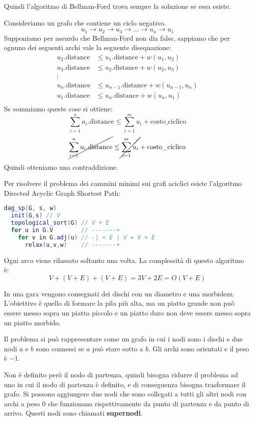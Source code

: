 \documentclass[a4paper]{article}
\begin{document}
Quindi l'algoritmo di Bellman-Ford trova sempre la soluzione se essa esiste.

\vspace{1em}
\noindent
Consideriamo un grafo che contiene un ciclo negativo.
\[
  u_1 \to u_2 \to u_3 \to \ldots \to u_n \to u_1
\] 
Supponiamo per assurdo che
Bellman-Ford non dia false, sappiamo che per ognuno dei seguenti archi vale la
seguente disequazione:
\[
\begin{aligned}
  u_2.\text{distance} & \le u_1.\text{distance} + w(u_1,u_2) \\
  u_3.\text{distance} & \le u_2.\text{distance} + w(u_2,u_3) \\
  \vdots\\
  u_n.\text{distance} & \le u_{n-1}.\text{distance} + w(u_{n-1},u_n) \\
  u_1.\text{distance} & \le u_{n}.\text{distance} + w(u_{n},u_1) \\
\end{aligned}
\] 
Se sommiamo queste cose si ottiene:
\[
  \sum_{i=1}^n u_i.\text{distance} \le \sum_{i=1}^m u_i + \text{costo\_ciclico}
\] 
\[
  \cancel{\sum_{i=1}^n u_i.\text{distance}} \le \cancel{\sum_{i=1}^m u_i} + \text{costo\_ciclico}
\] 
Quindi otteniamo una contraddizione.

\vspace{1em}
\noindent
Per risolvere il problema dei cammini minimi sui grafi aciclici esiste l'algoritmo
Directed Acyclic Graph Shortest Path:
\begin{lstlisting}[language=Scala]
dag_sp(G, s, w)
  init(G,s) // V
  topological_sort(G) // V + E
  for u in G.V        // -------+ 
    for v in G.adj(u) // -| < E | V = V + E
      relax(u,v,w)    // -------+
\end{lstlisting}
Ogni arco viene rilassato soltanto una volta. La complessità di questo algoritmo è:
\[
  V + (V + E) + (V + E) = 3V + 2E = O(V + E)
\] 

\begin{exercise}
  In una gara vengono consegnati dei dischi con un diametro e una morbidezz.
  L'obiettivo è quello di formare la pila più alta, ma un piatto grande non può essere
  messo sopra un piatto piccolo e un piatto duro non deve essere messo sopra un piatto
  morbido.

  \vspace{1em}
  \noindent
  Il problema si può rappresentare come un grafo in cui i nodi sono i dischi e due
  nodi \( a \) e \( b \) sono connessi se \( a \) può stare sotto a \( b \). Gli
  archi sono orientati e il peso è \( -1 \).

  \vspace{1em}
  \noindent
  Non è definito però il nodo di partenza, quindi bisogna ridurre il problema ad uno
  in cui il nodo di partenza è definito, e di conseguenza bisogna trasformare il grafo.
  Si possono aggiungere due nodi che sono collegati a tutti gli altri nodi con archi
  a peso 0 che funzionano rispettivamente da punto di partenza e da punto di arrivo.
  Questi nodi sono chiamati \textbf{supernodi}.
\end{exercise}
\end{document}
